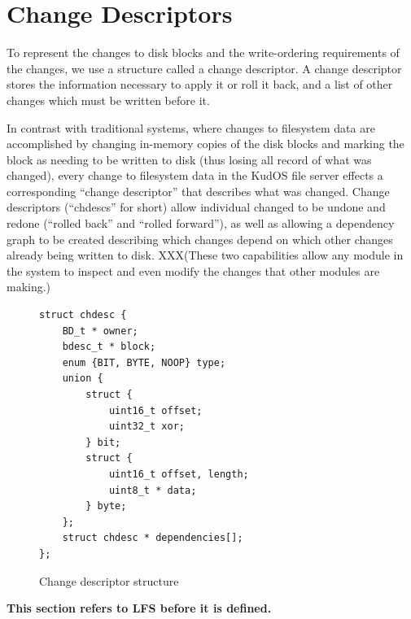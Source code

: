 \preparagraphspacing{}
\section*{Change Descriptors}
\label{sec:chdescs}

To represent the changes to disk blocks and the write-ordering requirements of
the changes, we use a structure called a change descriptor. A change descriptor
stores the information necessary to apply it or roll it back, and a list of
other changes which must be written before it.


In contrast with traditional systems, where changes to filesystem data are
accomplished by changing in-memory copies of the disk blocks and marking the
block as needing to be written to disk (thus losing all record of what was
changed), every change to filesystem data in the KudOS file server effects a
corresponding ``change descriptor'' that describes what was changed. Change
descriptors (``chdescs'' for short) allow individual changed to be undone and
redone (``rolled back'' and ``rolled forward''), as well as allowing a
dependency graph to be created describing which changes depend on which other
changes already being written to disk. XXX(These two capabilities allow any
module in the system to inspect and even modify the changes that other modules
are making.)

\begin{figure}
\begin{verbatim}
struct chdesc {
    BD_t * owner;
    bdesc_t * block;
    enum {BIT, BYTE, NOOP} type;
    union {
        struct {
            uint16_t offset;
            uint32_t xor;
        } bit;
        struct {
            uint16_t offset, length;
            uint8_t * data;
        } byte;
    };
    struct chdesc * dependencies[];
};
\end{verbatim}
\vspace{-10pt}
\caption{\label{fig:chdesc} Change descriptor structure}
\end{figure}

{\bf This section refers to LFS before it is defined.}

